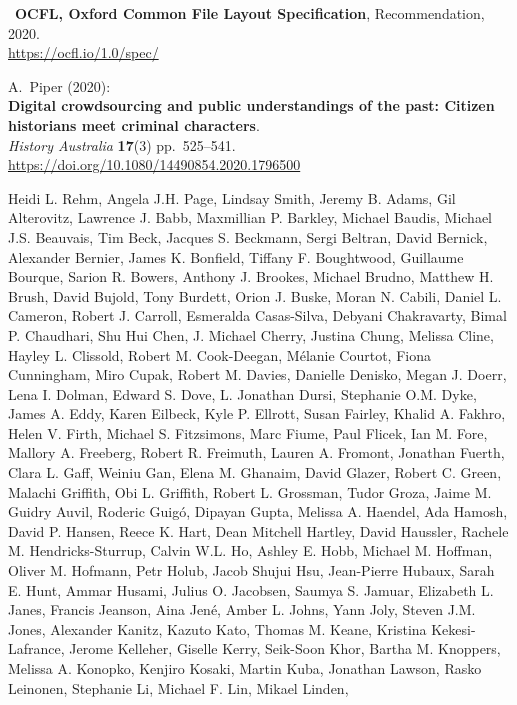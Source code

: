 \begin{thebibliography}{9}
~\textbf{OCFL, Oxford Common File Layout Specification},
Recommendation, 2020.\\
\url{https://ocfl.io/1.0/spec/}

A.~Piper (2020):\\
\textbf{Digital crowdsourcing and public understandings of the past:
Citizen historians meet criminal characters}.\\
\emph{History Australia} \textbf{17}(3) pp.~525--541.\\
\url{https://doi.org/10.1080/14490854.2020.1796500}


Heidi L. Rehm, Angela J.H. Page, Lindsay Smith, Jeremy B.
Adams, Gil Alterovitz, Lawrence J. Babb, Maxmillian P. Barkley, Michael
Baudis, Michael J.S. Beauvais, Tim Beck, Jacques S. Beckmann, Sergi
Beltran, David Bernick, Alexander Bernier, James K. Bonfield, Tiffany F.
Boughtwood, Guillaume Bourque, Sarion R. Bowers, Anthony J. Brookes,
Michael Brudno, Matthew H. Brush, David Bujold, Tony Burdett, Orion J.
Buske, Moran N. Cabili, Daniel L. Cameron, Robert J. Carroll, Esmeralda
Casas-Silva, Debyani Chakravarty, Bimal P. Chaudhari, Shu Hui Chen, J.
Michael Cherry, Justina Chung, Melissa Cline, Hayley L. Clissold, Robert
M. Cook-Deegan, Mélanie Courtot, Fiona Cunningham, Miro Cupak, Robert M.
Davies, Danielle Denisko, Megan J. Doerr, Lena I. Dolman, Edward S.
Dove, L. Jonathan Dursi, Stephanie O.M. Dyke, James A. Eddy, Karen
Eilbeck, Kyle P. Ellrott, Susan Fairley, Khalid A. Fakhro, Helen V.
Firth, Michael S. Fitzsimons, Marc Fiume, Paul Flicek, Ian M. Fore,
Mallory A. Freeberg, Robert R. Freimuth, Lauren A. Fromont, Jonathan
Fuerth, Clara L. Gaff, Weiniu Gan, Elena M. Ghanaim, David Glazer,
Robert C. Green, Malachi Griffith, Obi L. Griffith, Robert L. Grossman,
Tudor Groza, Jaime M. Guidry Auvil, Roderic Guigó, Dipayan Gupta,
Melissa A. Haendel, Ada Hamosh, David P. Hansen, Reece K. Hart, Dean
Mitchell Hartley, David Haussler, Rachele M. Hendricks-Sturrup, Calvin
W.L. Ho, Ashley E. Hobb, Michael M. Hoffman, Oliver M. Hofmann, Petr
Holub, Jacob Shujui Hsu, Jean-Pierre Hubaux, Sarah E. Hunt, Ammar
Husami, Julius O. Jacobsen, Saumya S. Jamuar, Elizabeth L. Janes,
Francis Jeanson, Aina Jené, Amber L. Johns, Yann Joly, Steven J.M.
Jones, Alexander Kanitz, Kazuto Kato, Thomas M. Keane, Kristina
Kekesi-Lafrance, Jerome Kelleher, Giselle Kerry, Seik-Soon Khor, Bartha
M. Knoppers, Melissa A. Konopko, Kenjiro Kosaki, Martin Kuba, Jonathan
Lawson, Rasko Leinonen, Stephanie Li, Michael F. Lin, Mikael Linden,

\end{thebibliography}

